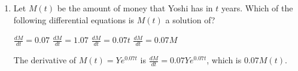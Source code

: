 \documentclass{article}
\begin{document}
\begin{enumerate}
\begin{enumerate}
   \emph{If you'd like to refresh your understanding
         of compound interest, see
          \#4 in section 4.3 of the workbook and
          Problem Set 19, \#2. You may use the continuous compounding formula, $A=Pe^{rt}$.}

    \begin{solution}
      This is continuous compounding, so the amount of money Yoshi will have in $t$ years is $Y e^{0.07 t}$.
    \end{solution}

  \item
\begin{problem}[\vfill]
      Let $M(t)$ be the amount of money that Yoshi has in $t$ years.
      Which of the following differential equations is $M(t)$ a solution
      of?
      
        \begin{enumerate}[label=\protect\maybecircle{\Alph*.}]
        \plainitem $\frac{dM}{dt} = 0.07$
        \plainitem $\frac{dM}{dt} = 1.07$
        \plainitem $\frac{dM}{dt} = 0.07 t$
        \circleitem $\frac{dM}{dt} = 0.07 M$
        \end{enumerate}
      
    \end{problem}

    \begin{solution}
      The derivative of $M(t) = Y e^{0.07 t}$ is $\frac{dM}{dt} = 0.07 Y
      e^{0.07 t}$, which is $0.07 M(t)$. 
    \end{solution}





\end{enumerate}
\end{enumerate}
\end{document}
